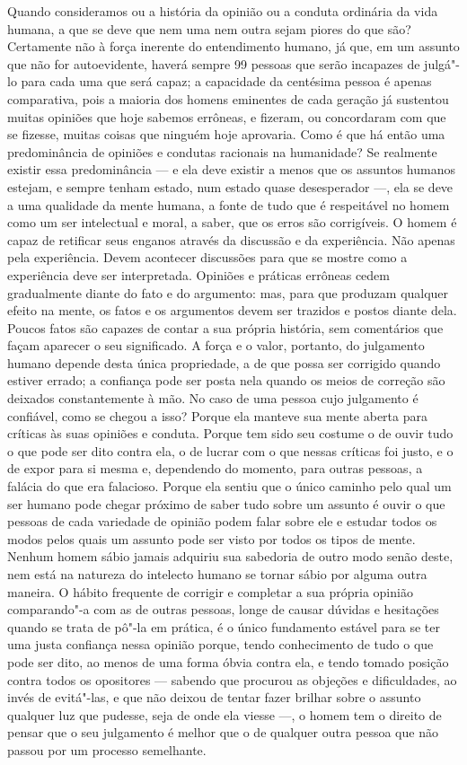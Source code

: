 Quando consideramos ou a história da opinião ou a conduta ordinária da
vida humana, a que se deve que nem uma nem outra sejam piores do que
são? Certamente não à força inerente do entendimento humano, já que,
em um assunto que não for autoevidente, haverá sempre 99
pessoas que serão incapazes de julgá"-lo para cada uma que será
capaz; a capacidade da centésima pessoa é apenas comparativa, pois a
maioria dos homens eminentes de cada geração já sustentou
muitas opiniões que hoje sabemos errôneas, e fizeram, ou
concordaram com que se fizesse, muitas coisas que ninguém hoje
aprovaria. Como é que há então uma predominância de opiniões e
condutas racionais na humanidade? Se realmente existir essa
predominância --- e ela deve existir a menos que os assuntos humanos
estejam, e sempre tenham estado, num estado quase desesperador ---, ela se
deve a uma qualidade da mente humana, a fonte de tudo que é respeitável
no homem como um ser intelectual e moral, a saber, que os erros são
corrigíveis. O homem é capaz de retificar seus enganos através da
discussão e da experiência. Não apenas pela experiência. Devem
acontecer discussões para que se mostre como a experiência deve ser
interpretada. Opiniões e práticas errôneas cedem gradualmente diante do
fato e do argumento: mas, para que produzam qualquer
efeito na mente, os fatos e os argumentos devem ser 
trazidos e postos diante dela. Poucos fatos
são capazes de contar a sua própria história, sem comentários que façam
aparecer o seu significado. A força e o valor, portanto, do julgamento
humano depende desta única propriedade, a de que possa ser 
corrigido quando estiver errado; a \mbox{confiança} pode ser posta nela quando
os meios de correção são deixados constantemente à mão. No caso de uma
pessoa cujo julgamento é confiável, como se chegou a isso? Porque ela
manteve sua mente aberta para críticas às suas opiniões e conduta.
Porque tem sido seu costume o de ouvir tudo o que pode ser dito contra
ela, o de lucrar com o que nessas críticas foi justo, e o de expor
para si mesma e, dependendo do momento, para outras pessoas, a falácia
do que era falacioso. Porque ela sentiu que o único caminho pelo qual
um ser humano pode chegar próximo de saber tudo sobre um assunto é
ouvir o que pessoas de cada variedade de opinião podem falar sobre ele
e estudar todos os modos pelos quais um assunto pode ser visto por
todos os tipos de mente. Nenhum homem sábio jamais adquiriu sua
sabedoria de outro modo senão deste, nem está na natureza do intelecto
humano se tornar sábio por alguma outra maneira. O hábito frequente de
corrigir e completar a sua própria opinião comparando"-a com as de
outras pessoas, longe de causar dúvidas e hesitações quando se trata de
pô"-la em prática, é o único fundamento estável para se ter uma justa
confiança nessa opinião porque, tendo conhecimento de tudo o que pode
ser dito, ao menos de uma forma óbvia contra ela, e tendo tomado
posição contra todos os opositores --- sabendo que procurou as
objeções e dificuldades, ao invés de evitá"-las, e que não deixou de
tentar fazer brilhar sobre o assunto qualquer luz que pudesse, seja de
onde ela viesse ---, o homem tem o direito de pensar que o seu julgamento 
é melhor que o de qualquer outra pessoa que não passou por um processo semelhante. 

